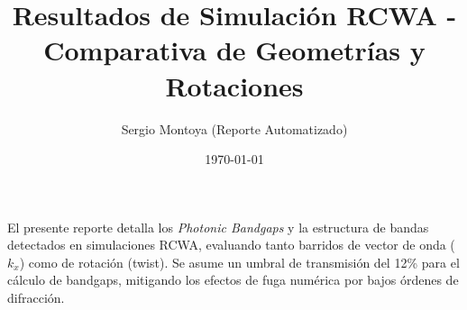 \documentclass{article}
\begin{document}
\title{Resultados de Simulación RCWA - Comparativa de Geometrías y Rotaciones}
\author{Sergio Montoya (Reporte Automatizado)}
\date{\today}
\maketitle

El presente reporte detalla los \textit{Photonic Bandgaps} y la estructura de bandas detectados en simulaciones RCWA, evaluando tanto barridos de vector de onda ($k_x$) como de rotación (twist).
Se asume un umbral de transmisión del 12\% para el cálculo de bandgaps, mitigando los efectos de fuga numérica por bajos órdenes de difracción.
\clearpage




\end{document}
